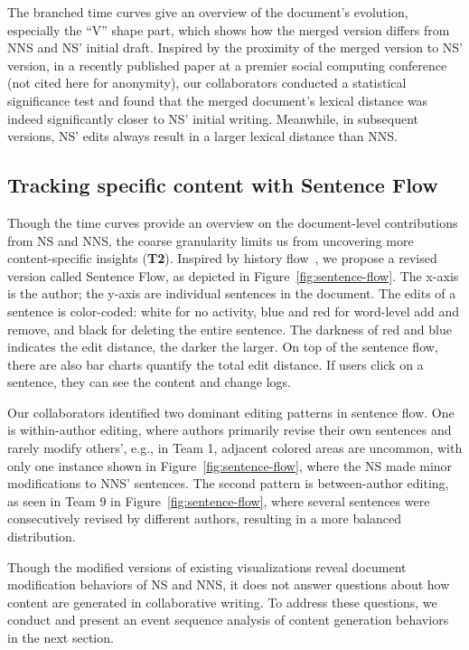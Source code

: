 The branched time curves give an overview of the document's evolution, especially the ``V'' shape part, which shows how the merged version differs from NNS and NS' initial draft. Inspired by the proximity of the merged version to NS' version, in a recently published paper at a premier social computing conference (not cited here for anonymity), our collaborators conducted a statistical significance test and found that the merged document's lexical distance was indeed significantly closer to NS' initial writing. Meanwhile, in subsequent versions, NS' edits always result in a larger lexical distance than NNS. 

\subsection{Tracking specific content with Sentence Flow}
Though the time curves provide an overview on the document-level contributions from NS and NNS, the coarse granularity limits us from uncovering more content-specific insights (\textbf{T2}). Inspired by history flow~\cite{viegas2004studying, wang2015docuviz}, we propose a revised version called Sentence Flow, as depicted in Figure~\ref{fig:sentence-flow}. The x-axis is the author; the y-axis are individual sentences in the document. The edits of a sentence is color-coded: white for no activity, blue and red for word-level add and remove, and black for deleting the entire sentence. The darkness of red and blue indicates the edit distance, the darker the larger. On top of the sentence flow, there are also bar charts quantify the total edit distance. If users click on a sentence, they can see the content and change logs.



Our collaborators identified two dominant editing patterns in sentence flow. One is within-author editing, where authors primarily revise their own sentences and rarely modify others', e.g., in Team 1, adjacent colored areas are uncommon, with only one instance shown in Figure~\ref{fig:sentence-flow}, where the NS made minor modifications to NNS' sentences. The second pattern is between-author editing, as seen in Team 9 in Figure~\ref{fig:sentence-flow}, where several sentences were consecutively revised by different authors, resulting in a more balanced distribution.

Though the modified versions of existing visualizations reveal document modification behaviors of NS and NNS, it does not answer questions about how content are generated in collaborative writing. To address these questions, we conduct and present an event sequence analysis of content generation behaviors in the next section.